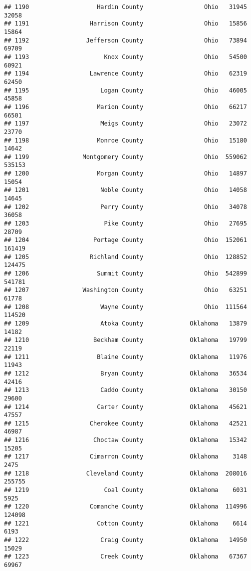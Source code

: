 \documentclass[
]{article}
\begin{document}
\begin{verbatim}
## 1190                   Hardin County                 Ohio   31945   32058
## 1191                 Harrison County                 Ohio   15856   15864
## 1192                Jefferson County                 Ohio   73894   69709
## 1193                     Knox County                 Ohio   54500   60921
## 1194                 Lawrence County                 Ohio   62319   62450
## 1195                    Logan County                 Ohio   46005   45858
## 1196                   Marion County                 Ohio   66217   66501
## 1197                    Meigs County                 Ohio   23072   23770
## 1198                   Monroe County                 Ohio   15180   14642
## 1199               Montgomery County                 Ohio  559062  535153
## 1200                   Morgan County                 Ohio   14897   15054
## 1201                    Noble County                 Ohio   14058   14645
## 1202                    Perry County                 Ohio   34078   36058
## 1203                     Pike County                 Ohio   27695   28709
## 1204                  Portage County                 Ohio  152061  161419
## 1205                 Richland County                 Ohio  128852  124475
## 1206                   Summit County                 Ohio  542899  541781
## 1207               Washington County                 Ohio   63251   61778
## 1208                    Wayne County                 Ohio  111564  114520
## 1209                    Atoka County             Oklahoma   13879   14182
## 1210                  Beckham County             Oklahoma   19799   22119
## 1211                   Blaine County             Oklahoma   11976   11943
## 1212                    Bryan County             Oklahoma   36534   42416
## 1213                    Caddo County             Oklahoma   30150   29600
## 1214                   Carter County             Oklahoma   45621   47557
## 1215                 Cherokee County             Oklahoma   42521   46987
## 1216                  Choctaw County             Oklahoma   15342   15205
## 1217                 Cimarron County             Oklahoma    3148    2475
## 1218                Cleveland County             Oklahoma  208016  255755
## 1219                     Coal County             Oklahoma    6031    5925
## 1220                 Comanche County             Oklahoma  114996  124098
## 1221                   Cotton County             Oklahoma    6614    6193
## 1222                    Craig County             Oklahoma   14950   15029
## 1223                    Creek County             Oklahoma   67367   69967

\end{verbatim}
\end{document}
